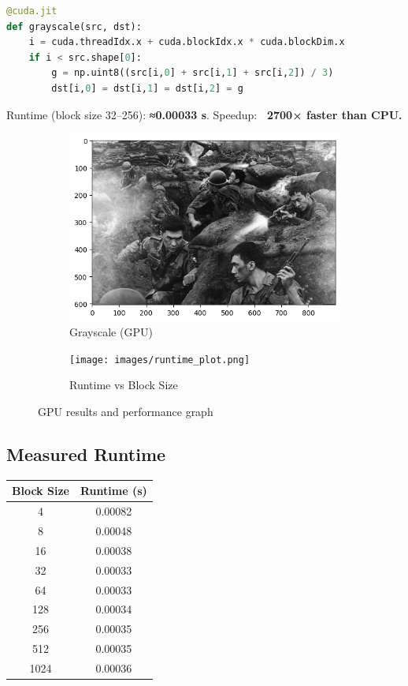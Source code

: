 \documentclass[hidelinks,12pt,a4paper]{article}
\begin{document}
\begin{tcolorbox}[colback=gray!5!white, colframe=blue!40!black, title=CUDA Kernel Code]
\begin{lstlisting}[language=Python]
@cuda.jit
def grayscale(src, dst):
    i = cuda.threadIdx.x + cuda.blockIdx.x * cuda.blockDim.x
    if i < src.shape[0]:
        g = np.uint8((src[i,0] + src[i,1] + src[i,2]) / 3)
        dst[i,0] = dst[i,1] = dst[i,2] = g
\end{lstlisting}
\end{tcolorbox}

Runtime (block size 32–256): \textbf{≈0.00033 s}.  
Speedup: \textbf{~2700× faster than CPU.}

\begin{figure}[H]
  \centering
  \begin{subfigure}[b]{0.45\textwidth}
    \includegraphics[width=\linewidth]{images/gray_gpu.png}
    \caption{Grayscale (GPU)}
  \end{subfigure}
  \hfill
  \begin{subfigure}[b]{0.45\textwidth}
    \texttt{[image: images/runtime\_plot.png]}
    \caption{Runtime vs Block Size}
  \end{subfigure}
  \caption{GPU results and performance graph}
\end{figure}

\subsection{Measured Runtime}
\begin{center}
\begin{tabular}{|c|c|}
\hline
\textbf{Block Size} & \textbf{Runtime (s)} \\ \hline
4 & 0.00082 \\ 
8 & 0.00048 \\ 
16 & 0.00038 \\ 
32 & 0.00033 \\ 
64 & 0.00033 \\ 
128 & 0.00034 \\ 
256 & 0.00035 \\ 
512 & 0.00035 \\ 
1024 & 0.00036 \\ \hline
\end{tabular}
\end{center}
\end{document}
